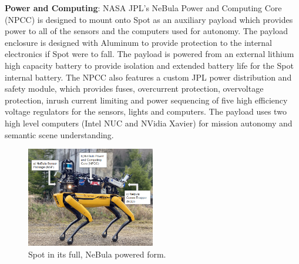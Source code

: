 \documentclass[a4paper, 10pt, conference]{ieeeconf}      %
\newcommand{\ph}[1]{{\textbf{#1}:}} %
\begin{document}
\ph{Power and Computing}
NASA JPL's NeBula Power and Computing Core (NPCC) is designed to mount onto Spot as an auxiliary payload which provides power to all of the sensors and the computers used for autonomy. The payload enclosure is designed with Aluminum to provide protection to the internal electronics if Spot were to fall. The payload is powered from an external lithium high capacity battery to provide isolation and extended battery life for the Spot internal battery. The NPCC also features a custom JPL power distribution and safety module, which provides fuses, overcurrent protection, overvoltage protection, inrush current limiting and power sequencing of five high efficiency voltage regulators for the sensors, lights and computers. %
The payload uses two high level computers (Intel NUC and NVidia Xavier) for mission autonomy and semantic scene understanding.

\begin{figure}[thpb]
  \centering
  \includegraphics[width=0.5\textwidth]{spot_iros/graphics/spot_full_annotated_1.PNG}
  \caption{Spot in its full, NeBula powered form.}
  \label{fig:spot_full_nebula_form}
\end{figure}

    
\end{document}
